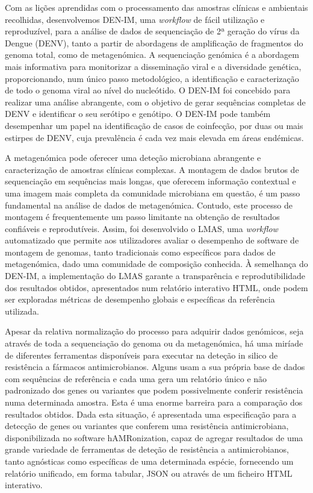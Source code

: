 Com as lições aprendidas com o processamento das amostras clínicas e ambientais recolhidas, desenvolvemos DEN-IM, uma \textit{workflow} de fácil utilização e reproduzível, para a análise de dados de sequenciação de 2ª geração do vírus da Dengue (DENV), tanto a partir de abordagens de amplificação de fragmentos do genoma total, como de metagenómica. A sequenciação genómica é a abordagem mais informativa para monitorizar a disseminação viral e a diversidade genética, proporcionando, num único passo metodológico, a identificação e caracterização de todo o genoma viral ao nível do nucleótido. O DEN-IM foi concebido para realizar uma análise abrangente, com o objetivo de gerar sequências completas de DENV e identificar o seu serótipo e genótipo. O DEN-IM pode também desempenhar um papel na identificação de casos de coinfecção, por duas ou mais estirpes de DENV, cuja prevalência é cada vez mais elevada em áreas endémicas. 

A metagenómica pode oferecer uma deteção microbiana abrangente e caracterização de amostras clínicas complexas. A montagem de dados brutos de sequenciação em sequências mais longas, que oferecem informação contextual e uma imagem mais completa da comunidade microbiana em questão, é um passo fundamental na análise de dados de metagenómica. Contudo, este processo de montagem é frequentemente um passo limitante na obtenção de resultados confiáveis e reprodutíveis. Assim, foi desenvolvido o LMAS, uma \textit{workflow} automatizado que permite aos utilizadores avaliar o desempenho de software de montagem de genomas, tanto tradicionais como específicos para dados de metagenómica, dado uma comunidade de composição conhecida. À semelhança do DEN-IM, a implementação do LMAS garante a transparência e reprodutibilidade dos resultados obtidos, apresentados num relatório interativo HTML, onde podem ser exploradas métricas de desempenho globais e específicas da referência utilizada. 

Apesar da relativa normalização do processo para adquirir dados genómicos, seja através de toda a sequenciação do genoma ou da metagenómica, há uma miríade de diferentes ferramentas disponíveis para executar na deteção in silico de resistência a fármacos antimicrobianos. Alguns usam a sua própria base de dados com sequências de referência e cada uma gera um relatório único e não padronizado dos genes ou variantes que podem possivelmente conferir resistência numa determinada amostra. Esta é uma enorme barreira para a comparação dos resultados obtidos. Dada esta situação, é apresentada uma especificação para a detecção de genes ou variantes que conferem uma resistência antimicrobiana, disponibilizada no software hAMRonization, capaz de agregar resultados de uma grande variedade de ferramentas de deteção de resistência a antimicrobianos, tanto agnósticas como específicas de uma determinada espécie, fornecendo um relatório unificado, em forma tabular, JSON ou através de um ficheiro HTML interativo.

